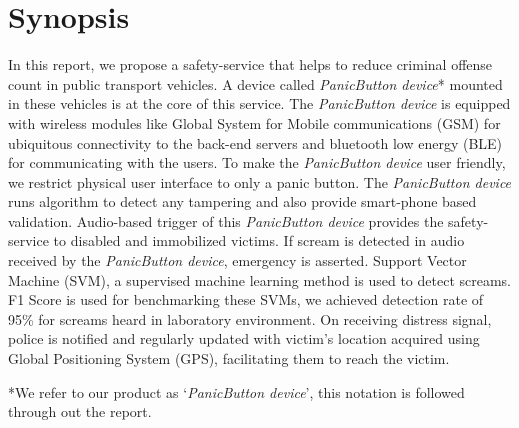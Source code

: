 
\chapter*{Synopsis}

In this report, we propose a safety-service that helps to reduce criminal offense count in public transport vehicles. A device called \emph{PanicButton device}* mounted in these vehicles is at the core of this service. The \emph{PanicButton device} is equipped with wireless modules like Global System for Mobile communications (GSM) for ubiquitous connectivity to the back-end servers and bluetooth low energy (BLE) for communicating with the users. To make the \emph{PanicButton device} user friendly, we restrict physical user interface to only a panic button. The \emph{PanicButton device} runs algorithm to detect any tampering and also provide smart-phone based validation. Audio-based trigger of this \emph{PanicButton device} provides the safety-service to disabled and immobilized victims. If scream is detected in audio received by the \emph{PanicButton device}, emergency is asserted. Support Vector Machine (SVM), a supervised machine learning method is used to  detect screams. F1 Score is used for benchmarking these SVMs, we achieved detection rate of 95\% for screams heard in laboratory environment. On receiving distress signal, police is notified and regularly updated with victim's location acquired using Global Positioning System (GPS), facilitating them to reach the victim.

*We refer to our product as `\emph{PanicButton device}', this notation is followed through out the report.